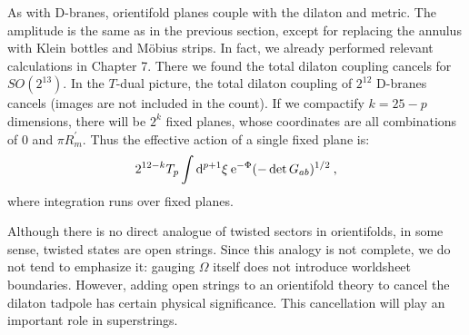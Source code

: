 As with D-branes, orientifold planes couple with the dilaton and metric. 
The amplitude is the same as in the previous section, except for replacing the annulus with Klein bottles and Möbius strips. 
In fact, we already performed relevant calculations in Chapter 7. There we found the total dilaton coupling cancels for $S O\left(2^{13}\right)$. 
In the $T$-dual picture, the total dilaton coupling of $2^{12}$ D-branes cancels (images are not included in the count). If we compactify $k=25-p$ dimensions, there will be $2^{k}$ fixed planes, 
whose coordinates are all combinations of 0 and $\pi R_{m}^{\prime}$. 
Thus the effective action of a single fixed plane is:
\begin{equation}
	2^{12-k} T_{p} \int \mathrm{d}^{p+1} \xi \: \mathrm{e}^{-\Phi} (-\operatorname{det} G_{ab})^{1/2} \:, \label{8.8.5}
\end{equation}
where integration runs over fixed planes.

Although there is no direct analogue of twisted sectors in orientifolds, in some sense, twisted states are open strings. Since this analogy is not complete, we do not tend to emphasize it: 
gauging $\Omega$ itself does not introduce worldsheet boundaries. 
However, adding open strings to an orientifold theory to cancel the dilaton tadpole has certain physical significance. This cancellation will play an important role in superstrings.